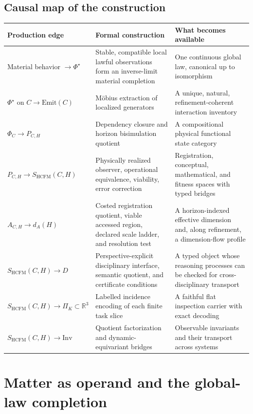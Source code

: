 \documentclass[11pt]{article}
\theoremstyle{definition}
\begin{document}
\subsection{Causal map of the construction}

\begin{center}
\begin{tabular}{@{}p{}p{}p{}@{}}
\toprule
Production edge & Formal construction & What becomes available\\
\midrule
Material behavior $\to \Phi^{\star}$ & Stable, compatible local lawful observations form an inverse-limit material completion & One continuous global law, canonical up to isomorphism\\
$\Phi^{\star}$ on $C \to \mathrm{Emit}(C)$ & M\"obius extraction of localized generators & A unique, natural, refinement-coherent interaction inventory\\
$\Phi_C \to P_{C,H}$ & Dependency closure and horizon bisimulation quotient & A compositional physical functional state category\\
$P_{C,H} \to S_{\mathrm{HCFM}}(C, H)$ & Physically realized observer, operational equivalence, viability, error correction & Registration, conceptual, mathematical, and fitness spaces with typed bridges\\
$A_{C,H} \to d_A(H)$ & Costed registration quotient, viable accessed region, declared scale ladder, and resolution test & A horizon-indexed effective dimension and, along refinement, a dimension-flow profile\\
$S_{\mathrm{HCFM}}(C, H) \to D$ & Perspective-explicit disciplinary interface, semantic quotient, and certificate conditions & A typed object whose reasoning processes can be checked for cross-disciplinary transport\\
$S_{\mathrm{HCFM}}(C, H) \to \Pi_K \subset \mathbb{R}^3$ & Labelled incidence encoding of each finite task slice & A faithful flat inspection carrier with exact decoding\\
$S_{\mathrm{HCFM}}(C, H) \to \mathrm{Inv}$ & Quotient factorization and dynamic-equivariant bridges & Observable invariants and their transport across systems\\
\bottomrule
\end{tabular}
\end{center}

\section{Matter as operand and the global-law completion}
\end{document}
